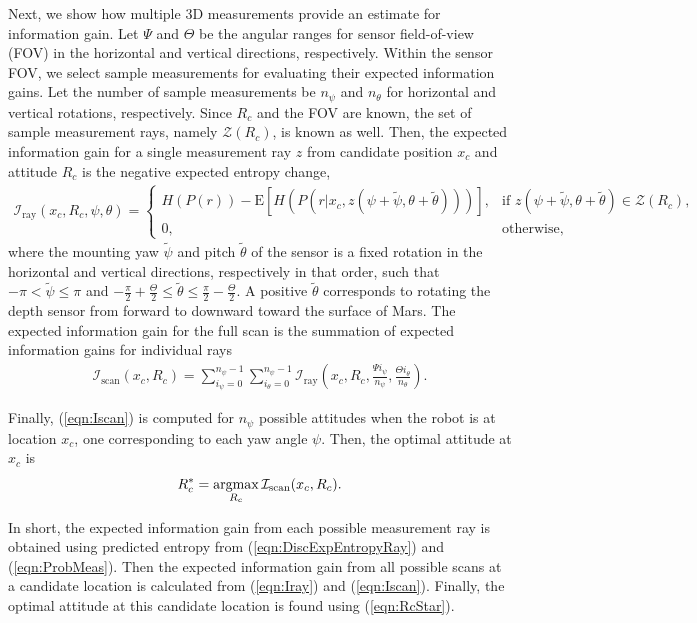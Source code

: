 \documentclass[conf]{new-aiaa}
\newcommand{\refeqn}[1]{(\ref{eqn:#1})}
\newcommand{\argmax}{\operatornamewithlimits{argmax}}
\begin{document}
Next, we show how multiple 3D measurements provide an estimate for information gain. Let $\Psi$ and $\Theta$ be the angular ranges for sensor field-of-view (FOV) in the horizontal and vertical directions, respectively. Within the sensor FOV, we select sample measurements for evaluating their expected information gains. Let the number of sample measurements be $n_\psi$ and $n_\theta$ for horizontal and vertical rotations, respectively. Since $R_c$ and the FOV are known, the set of sample measurement rays, namely $\mathcal{Z}(R_c)$, is known as well. Then, the expected information gain for a single measurement ray $z$ from candidate position $x_c$ and attitude $R_c$ is the negative expected entropy change,
\begin{align}
\label{eqn:Iray}
\mathcal{I}_\text{ray}(x_c,R_c,\psi,\theta)=
\begin{cases}
H(P(r))-\text{E}[H(P(r|x_c,z(\psi+\tilde{\psi},\theta+\tilde{\theta})))], & \mbox{if } z(\psi+\tilde{\psi},\theta+\tilde{\theta})\in\mathcal{Z}(R_c), \\ 
0,                                                                                    & \mbox{otherwise},
\end{cases}
\end{align}
where the mounting yaw $\tilde{\psi}$ and pitch $\tilde{\theta}$ of the sensor is a fixed rotation in the horizontal and vertical directions, respectively in that order, such that $-\pi<\tilde{\psi}\leq\pi$ and $-\frac{\pi}{2}+\frac\Theta2\leq\tilde{\theta}\leq\frac{\pi}{2}-\frac\Theta2$. A positive $\tilde{\theta}$ corresponds to rotating the depth sensor from forward to downward toward the surface of Mars. The expected information gain for the full scan is the summation of expected information gains for individual rays
\begin{align}
\label{eqn:Iscan}
\mathcal{I}_\text{scan}(x_c,R_c)=\sum_{i_\psi=0}^{n_\psi-1}\sum_{i_\theta=0}^{n_\psi-1}\mathcal{I}_\text{ray}\left(x_c,R_c,\frac{\Psi i_\psi}{n_\psi},\frac{\Theta i_\theta}{n_\theta}\right).
\end{align}

Finally, \refeqn{Iscan} is computed for $n_\psi$ possible attitudes when the robot is at location $x_c$, one corresponding to each yaw angle $\psi$. Then, the optimal attitude at $x_c$ is
\begin{align}
\label{eqn:RcStar}
R_c^*=\argmax_{R_c} \mathcal{I}_\text{scan}(x_c,R_c).
\end{align}

In short, the expected information gain from each possible measurement ray is obtained using predicted entropy from \refeqn{DiscExpEntropyRay} and \refeqn{ProbMeas}. Then the expected information gain from all possible scans at a candidate location is calculated from \refeqn{Iray} and \refeqn{Iscan}. Finally, the optimal attitude at this candidate location is found using \refeqn{RcStar}.
\end{document}
